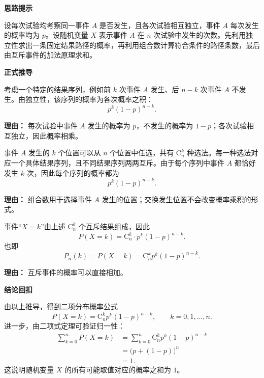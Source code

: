 \begin{proofbox}
	\textbf{\textcolor{CProof}{思路提示}}

	设每次试验均考察同一事件 $A$ 是否发生，且各次试验相互独立，事件 $A$ 每次发生的概率均为 $p$。设随机变量 $X$ 表示事件 $A$ 在 $n$ 次试验中发生的次数。先利用独立性求出一条固定结果路径的概率，再利用组合数计算符合条件的路径条数，最后由互斥事件的加法原理求和。

	\medskip
	\textbf{\textcolor{CProof}{正式推导}}
	\begin{description}[style=nextline, leftmargin=2.8em, labelsep=0.5em, itemsep=0.55em]
		\item[\textbf{步骤一（固定顺序求概率）：}] 考虑一个特定的结果序列，例如前 $k$ 次事件 $A$ 发生、后 $n-k$ 次事件 $A$ 不发生。由独立性，该序列的概率为各次概率之积：
		      \[
			      p^k(1-p)^{n-k}.
		      \]
		      \par\textbf{理由：} 每次试验中事件 $A$ 发生的概率为 $p$，不发生的概率为 $1-p$；各次试验相互独立，因此概率相乘。

		\item[\textbf{步骤二（计数不同位置）：}] 事件 $A$ 发生的 $k$ 个位置可以从 $n$ 个位置中任选，共有 $\mathrm{C}_n^k$ 种选法。每一种选法对应一个具体结果序列，且不同结果序列两两互斥。由于每个序列中事件 $A$ 都恰好发生 $k$ 次，因此每个序列的概率都为
		      \[
			      p^k(1-p)^{n-k}.
		      \]
		      \par\textbf{理由：} 组合数用于选择事件 $A$ 发生的位置；交换发生位置不会改变概率乘积的形式。

		\item[\textbf{步骤三（加法原理求和）：}] 事件“$X=k$”由上述 $\mathrm{C}_n^k$ 个互斥结果组成，因此
		      \[
			      P(X=k)
			      =
			      \mathrm{C}_n^k \cdot p^k(1-p)^{n-k}.
		      \]
		      也即
		      \[
			      P_n(k)=P(X=k)=\mathrm{C}_n^k p^k(1-p)^{n-k}.
		      \]
		      \par\textbf{理由：} 互斥事件的概率可以直接相加。
	\end{description}

	\medskip
	\textbf{\textcolor{CProof}{结论回扣}}

	由以上推导，得到二项分布概率公式
	\[
		P(X=k)=\mathrm{C}_n^k p^k(1-p)^{n-k},
		\qquad k=0,1,\dots,n.
	\]
	进一步，由二项式定理可验证归一性：
	\[
		\begin{aligned}
			\sum_{k=0}^n P(X=k)
			 & =
			\sum_{k=0}^n \mathrm{C}_n^k p^k(1-p)^{n-k} \\
			 & =
			\bigl(p+(1-p)\bigr)^n                      \\
			 & =1.
		\end{aligned}
	\]
	这说明随机变量 $X$ 的所有可能取值对应的概率之和为 $1$。
\end{proofbox}